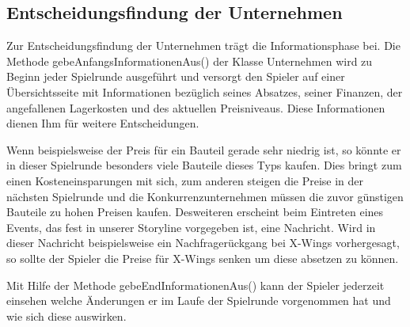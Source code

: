 \subsection{Entscheidungsfindung der Unternehmen}
\label{sub:fachkonzept-implementierung-entscheidungsfindung}

Zur Entscheidungsfindung der Unternehmen trägt die Informationsphase bei. Die Methode gebeAnfangsInformationenAus()
der Klasse Unternehmen wird zu Beginn jeder Spielrunde ausgeführt und versorgt den Spieler auf einer Übersichtsseite
mit Informationen bezüglich seines Absatzes, seiner Finanzen, der angefallenen Lagerkosten und des aktuellen Preisniveaus.
Diese Informationen dienen Ihm für weitere Entscheidungen.

Wenn beispielsweise der Preis für ein Bauteil gerade sehr niedrig ist, so könnte er in dieser Spielrunde besonders viele
Bauteile dieses Typs kaufen. Dies bringt zum einen Kosteneinsparungen mit sich, zum anderen steigen die Preise in der nächsten
Spielrunde und die Konkurrenzunternehmen müssen die zuvor günstigen Bauteile zu hohen Preisen kaufen. Desweiteren erscheint
beim Eintreten eines Events, das fest in unserer Storyline vorgegeben ist, eine Nachricht. Wird in dieser Nachricht
beispielsweise ein Nachfragerückgang bei X-Wings vorhergesagt, so sollte der Spieler die Preise für X-Wings senken
um diese absetzen zu können.

Mit Hilfe der Methode gebeEndInformationenAus() kann der Spieler jederzeit einsehen welche Änderungen er im Laufe der
Spielrunde vorgenommen hat und wie sich diese auswirken.